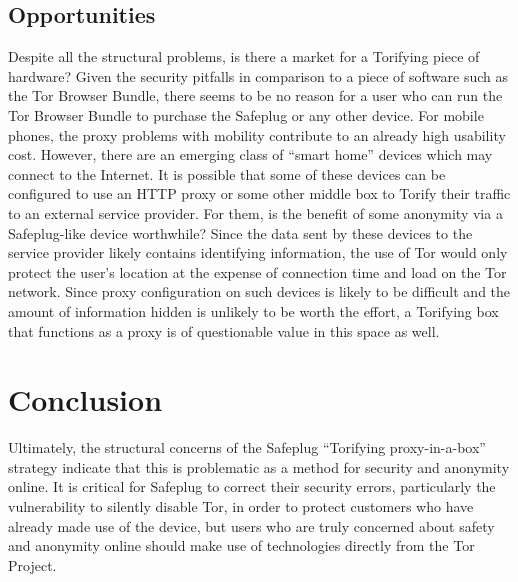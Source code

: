 \documentclass[letterpaper,twocolumn,10pt]{article}
\begin{document}
\subsection{Opportunities}
Despite all the structural problems, is there a market for a Torifying piece of hardware?  Given the security pitfalls in comparison to a piece of software such as the Tor Browser Bundle, there seems to be no reason for a user who can run the Tor Browser Bundle to purchase the Safeplug or any other device.  For mobile phones, the proxy problems with mobility contribute to an already high usability cost.  However, there are an emerging class of ``smart home'' devices which may connect to the Internet.  It is possible that some of these devices can be configured to use an HTTP proxy or some other middle box to Torify their traffic to an external service provider.  For them, is the benefit of some anonymity via a Safeplug-like device worthwhile?  Since the data sent by these devices to the service provider likely contains identifying information, the use of Tor would only protect the user's location at the expense of connection time and load on the Tor network.  Since proxy configuration on such devices is likely to be difficult and the amount of information hidden is unlikely to be worth the effort, a Torifying box that functions as a proxy is of questionable value in this space as well.

\section{Conclusion}
Ultimately, the structural concerns of the Safeplug ``Torifying proxy-in-a-box'' strategy indicate that this is problematic as a method for security and anonymity online.  It is critical for Safeplug to correct their security errors, particularly the vulnerability to silently disable Tor, in order to protect customers who have already made use of the device, but users who are truly concerned about safety and anonymity online should make use of technologies directly from the Tor Project.

{\footnotesize 
}

\end{document}
